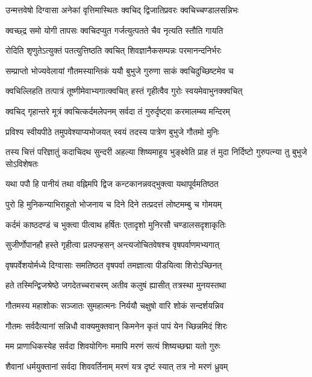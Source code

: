 \twolineshloka
{उन्मत्तवेषो दिग्वासा अनेकां वृत्तिमास्थितः}
{क्वचिद् द्विजातिप्रवरः क्वचिच्चण्डालसन्निभः}%

\twolineshloka
{क्वच्छ्द्र समो योगी तापसः क्वचिदप्युत}
{गर्जत्युत्पतते चैव नृत्यति स्तौति गायति}%

\twolineshloka
{रोदिति शृणुतेऽत्युक्तं पतत्युत्तिष्ठति क्वचित्}
{शिवज्ञानैकसम्पन्नः परमानन्दनिर्भरः}%

\twolineshloka
{सम्प्राप्तो भोज्यवेलायां गौतमस्यान्तिकं ययौ}
{बुभुजे गुरुणा साकं क्वचिदुच्छिष्टमेव च}%

\twolineshloka
{क्वचिल्लिहति तत्पात्रं तूष्णीमेवाभ्यगात्क्वचित्}
{हस्तं गृहीत्वैव गुरोः स्वयमेवाभुनक्क्वचित्}%

\twolineshloka
{क्वचिद् गृहान्तरे मूत्रं क्वचित्कर्दमलेपनम्}
{सर्वदा तं गुरुर्दृष्ट्वा करमालम्ब्य मन्दिरम्}%

\twolineshloka
{प्रविश्य स्वीयपीठे तमुपवेश्याप्यभोजयत्}
{स्वयं तदस्य पात्रेण बुभुजे गौतमो मुनिः}%

\threelineshloka
{तस्य चित्तं परिज्ञातुं कदाचिदथ सुन्दरी}
{अहल्या शिष्यमाहूय भुङ्क्ष्वेति प्राह तं मुदा}
{निर्दिष्टो गुरुपत्न्या तु बुभुजे सोऽविशेषतः}%

\twolineshloka
{यथा पपौ हि पानीयं तथा वह्निमपि द्विज}
{कन्टकानन्नवद्भुक्त्वा यथापूर्वमतिष्ठत}%

\twolineshloka
{पुरो हि मुनिकन्याभिराहूतो भोजनाय च}
{दिने दिने तत्प्रदत्तं लोष्टमम्बु च गोमयम्}%

\twolineshloka
{कर्दमं काष्ठदण्डं च भुक्त्वा पीत्वाथ हर्षितः}
{एतादृशो मुनिरसौ चण्डालसदृशाकृतिः}%

\twolineshloka
{सुजीर्णोपानहौ हस्ते गृहीत्वा प्रलपन्हसन्}
{अन्त्यजोचितवेषश्च वृषपर्वाणमभ्यगात्}%

\twolineshloka
{वृषपर्वेशयोर्मध्ये दिग्वासाः समतिष्ठत}
{वृषपर्वा तमज्ञात्वा पीडयित्वा शिरोऽच्छिनत्}%

\twolineshloka
{हते तस्मिन्द्विजश्रेष्ठे जगदेतच्चराचरम्}
{अतीव कलुषं ह्यासीत् तत्रस्था मुनयस्तथा}%

\twolineshloka
{गौतमस्य महाशोकः सञ्जातः सुमहात्मनः}
{निर्ययौ चक्षुषो वारि शोकं सन्दर्शयन्निव}%

\twolineshloka
{गौतमः सर्वदैत्यानां सन्निधौ वाक्यमुक्तवान्}
{किमनेन कृतं पापं येन च्छिन्नमिदं शिरः}%

\twolineshloka
{मम प्राणाधिकस्येह सर्वदा शिवयोगिनः}
{ममापि मरणं सत्यं शिष्यच्छद्मा यतो गुरुः}%

\twolineshloka
{शैवानां धर्मयुक्तानां सर्वदा शिववर्तिनाम्}
{मरणं यत्र दृष्टं स्यात् तत्र नो मरणं ध्रुवम्}%

